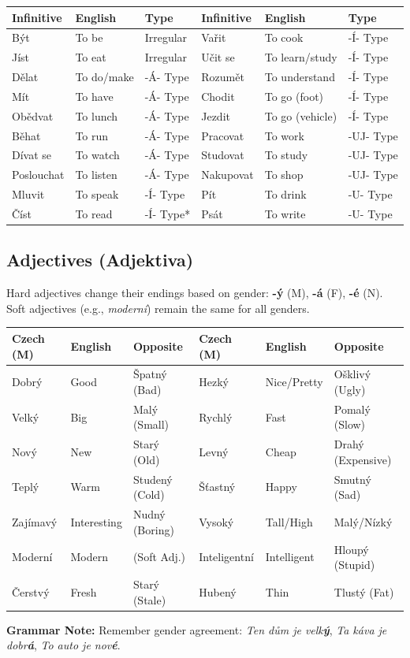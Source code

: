 \begin{center}
\small
\begin{tabular}{lll | lll}
\hline
\textbf{Infinitive} & \textbf{English} & \textbf{Type} & \textbf{Infinitive} & \textbf{English} & \textbf{Type} \\ \hline
Být & To be & Irregular & Vařit & To cook & -Í- Type \\
Jíst & To eat & Irregular & Učit se & To learn/study & -Í- Type \\
Dělat & To do/make & -Á- Type & Rozumět & To understand & -Í- Type \\
Mít & To have & -Á- Type & Chodit & To go (foot) & -Í- Type \\
Obědvat & To lunch & -Á- Type & Jezdit & To go (vehicle) & -Í- Type \\
Běhat & To run & -Á- Type & Pracovat & To work & -UJ- Type \\
Dívat se & To watch & -Á- Type & Studovat & To study & -UJ- Type \\
Poslouchat & To listen & -Á- Type & Nakupovat & To shop & -UJ- Type \\
Mluvit & To speak & -Í- Type & Pít & To drink & -U- Type \\
Číst & To read & -Í- Type* & Psát & To write & -U- Type \\ \hline
\end{tabular}
\end{center}

\subsection{Adjectives (Adjektiva)}
Hard adjectives change their endings based on gender: \textbf{-ý} (M), \textbf{-á} (F), \textbf{-é} (N). Soft adjectives (e.g., \textit{moderní}) remain the same for all genders.

\begin{center}
\small
\begin{tabular}{lll | lll}
\hline
\textbf{Czech (M)} & \textbf{English} & \textbf{Opposite} & \textbf{Czech (M)} & \textbf{English} & \textbf{Opposite} \\ \hline
Dobrý & Good & Špatný (Bad) & Hezký & Nice/Pretty & Ošklivý (Ugly) \\
Velký & Big & Malý (Small) & Rychlý & Fast & Pomalý (Slow) \\
Nový & New & Starý (Old) & Levný & Cheap & Drahý (Expensive) \\
Teplý & Warm & Studený (Cold) & Šťastný & Happy & Smutný (Sad) \\
Zajímavý & Interesting & Nudný (Boring) & Vysoký & Tall/High & Malý/Nízký \\
Moderní & Modern & (Soft Adj.) & Inteligentní & Intelligent & Hloupý (Stupid) \\
Čerstvý & Fresh & Starý (Stale) & Hubený & Thin & Tlustý (Fat) \\ \hline
\end{tabular}
\end{center}
\small \textbf{Grammar Note:} 
Remember gender agreement: \textit{Ten dům je velk\textbf{ý}}, \textit{Ta káva je dobr\textbf{á}}, \textit{To auto je nov\textbf{é}}.

